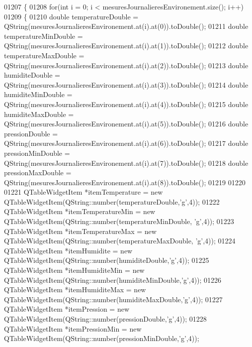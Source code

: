 \begin{DoxyCode}
01207 \{
01208     \textcolor{keywordflow}{for}(\textcolor{keywordtype}{int} i = 0; i < mesuresJournalieresEnvironement.size(); i++)
01209     \{
01210         \textcolor{keywordtype}{double} temperatureDouble = QString(mesuresJournalieresEnvironement.at(i).at(0)).toDouble();
01211         \textcolor{keywordtype}{double} temperatureMinDouble = QString(mesuresJournalieresEnvironement.at(i).at(1)).toDouble();
01212         \textcolor{keywordtype}{double} temperatureMaxDouble = QString(mesuresJournalieresEnvironement.at(i).at(2)).toDouble();
01213         \textcolor{keywordtype}{double} humiditeDouble = QString(mesuresJournalieresEnvironement.at(i).at(3)).toDouble();
01214         \textcolor{keywordtype}{double} humiditeMinDouble = QString(mesuresJournalieresEnvironement.at(i).at(4)).toDouble();
01215         \textcolor{keywordtype}{double} humiditeMaxDouble = QString(mesuresJournalieresEnvironement.at(i).at(5)).toDouble();
01216         \textcolor{keywordtype}{double} pressionDouble = QString(mesuresJournalieresEnvironement.at(i).at(6)).toDouble();
01217         \textcolor{keywordtype}{double} pressionMinDouble = QString(mesuresJournalieresEnvironement.at(i).at(7)).toDouble();
01218         \textcolor{keywordtype}{double} pressionMaxDouble = QString(mesuresJournalieresEnvironement.at(i).at(8)).toDouble();
01219 
01220 
01221         QTableWidgetItem *itemTemperature = \textcolor{keyword}{new} QTableWidgetItem(QString::number(temperatureDouble,\textcolor{charliteral}{'g'},4));
01222         QTableWidgetItem *itemTemperatureMin = \textcolor{keyword}{new} QTableWidgetItem(QString::number(temperatureMinDouble,\textcolor{charliteral}{
      'g'},4));
01223         QTableWidgetItem *itemTemperatureMax = \textcolor{keyword}{new} QTableWidgetItem(QString::number(temperatureMaxDouble,\textcolor{charliteral}{
      'g'},4));
01224         QTableWidgetItem *itemHumidite = \textcolor{keyword}{new} QTableWidgetItem(QString::number(humiditeDouble,\textcolor{charliteral}{'g'},4));
01225         QTableWidgetItem *itemHumiditeMin = \textcolor{keyword}{new} QTableWidgetItem(QString::number(humiditeMinDouble,\textcolor{charliteral}{'g'},4));
01226         QTableWidgetItem *itemHumiditeMax = \textcolor{keyword}{new} QTableWidgetItem(QString::number(humiditeMaxDouble,\textcolor{charliteral}{'g'},4));
01227         QTableWidgetItem *itemPression = \textcolor{keyword}{new} QTableWidgetItem(QString::number(pressionDouble,\textcolor{charliteral}{'g'},4));
01228         QTableWidgetItem *itemPressionMin = \textcolor{keyword}{new} QTableWidgetItem(QString::number(pressionMinDouble,\textcolor{charliteral}{'g'},4));

\end{DoxyCode}
